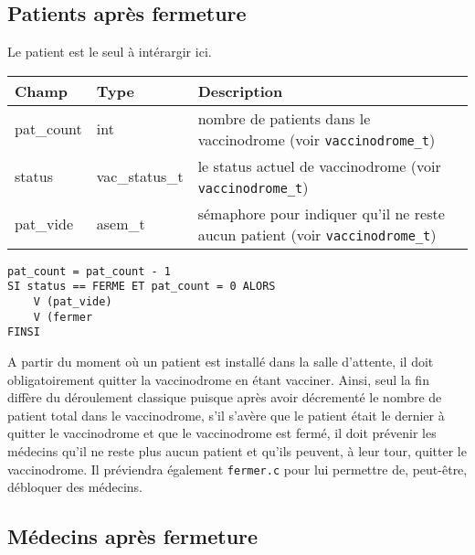 \documentclass[a4paper]{article}
\begin{document}
\newpage 
\subsection{Patients après fermeture}

Le patient est le seul à intérargir ici.
\bigskip \newline
\begin{tabularx}{\linewidth}{|l|l|>{\strut}X|}
  \hline%
  Champ & Type & Description \\ \hline%
  pat\_count & int & nombre de patients dans le vaccinodrome (voir \texttt{vaccinodrome\_t}) \\ \hline%
  status & vac\_status\_t & le status actuel de vaccinodrome (voir \texttt{vaccinodrome\_t}) \\ \hline%
  pat\_vide & asem\_t & sémaphore pour indiquer qu’il ne reste aucun patient (voir \texttt{vaccinodrome\_t}) \\ \hline%
\end{tabularx}

\begin{verbatim}
pat_count = pat_count - 1
SI status == FERME ET pat_count = 0 ALORS
    V (pat_vide)
    V (fermer
FINSI
\end{verbatim}

\medskip \par
A partir du moment où un patient est installé dans la salle d'attente, il doit obligatoirement quitter la vaccinodrome en étant vacciner. Ainsi, seul la fin diffère du déroulement classique puisque après avoir décrementé le nombre de patient total dans le vaccinodrome, s'il s'avère que le patient était le dernier à quitter le vaccinodrome et que le vaccinodrome est fermé, il doit prévenir les médecins qu'il ne reste plus aucun patient et qu'ils peuvent, à leur tour, quitter le vaccinodrome. Il préviendra également \texttt{fermer.c} pour lui permettre de, peut-être, débloquer des médecins.

\subsection{Médecins après fermeture}
\end{document}
